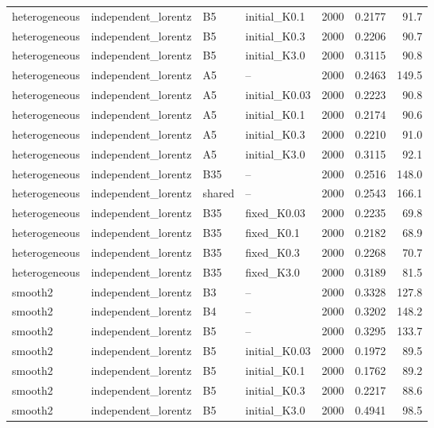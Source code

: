\begin{longtable}{llllrrr}
\rowcolor{oursbg}
heterogeneous & independent\_lorentz & B5 & initial\_K0.1 & 2000 & 0.2177 & 91.7 \\
\rowcolor{oursbg}
heterogeneous & independent\_lorentz & B5 & initial\_K0.3 & 2000 & 0.2206 & 90.7 \\
\rowcolor{oursbg}
heterogeneous & independent\_lorentz & B5 & initial\_K3.0 & 2000 & 0.3115 & 90.8 \\
heterogeneous & independent\_lorentz & A5 & -- & 2000 & 0.2463 & 149.5 \\
heterogeneous & independent\_lorentz & A5 & initial\_K0.03 & 2000 & 0.2223 & 90.8 \\
heterogeneous & independent\_lorentz & A5 & initial\_K0.1 & 2000 & 0.2174 & 90.6 \\
heterogeneous & independent\_lorentz & A5 & initial\_K0.3 & 2000 & 0.2210 & 91.0 \\
heterogeneous & independent\_lorentz & A5 & initial\_K3.0 & 2000 & 0.3115 & 92.1 \\
heterogeneous & independent\_lorentz & B35 & -- & 2000 & 0.2516 & 148.0 \\
heterogeneous & independent\_lorentz & shared & -- & 2000 & 0.2543 & 166.1 \\
heterogeneous & independent\_lorentz & B35 & fixed\_K0.03 & 2000 & 0.2235 & 69.8 \\
heterogeneous & independent\_lorentz & B35 & fixed\_K0.1 & 2000 & 0.2182 & 68.9 \\
heterogeneous & independent\_lorentz & B35 & fixed\_K0.3 & 2000 & 0.2268 & 70.7 \\
heterogeneous & independent\_lorentz & B35 & fixed\_K3.0 & 2000 & 0.3189 & 81.5 \\
smooth2 & independent\_lorentz & B3 & -- & 2000 & 0.3328 & 127.8 \\
smooth2 & independent\_lorentz & B4 & -- & 2000 & 0.3202 & 148.2 \\
\rowcolor{oursbg}
smooth2 & independent\_lorentz & B5 & -- & 2000 & 0.3295 & 133.7 \\
\rowcolor{oursbg}
smooth2 & independent\_lorentz & B5 & initial\_K0.03 & 2000 & 0.1972 & 89.5 \\
\rowcolor{oursbg}
smooth2 & independent\_lorentz & B5 & initial\_K0.1 & 2000 & 0.1762 & 89.2 \\
\rowcolor{oursbg}
smooth2 & independent\_lorentz & B5 & initial\_K0.3 & 2000 & 0.2217 & 88.6 \\
\rowcolor{oursbg}
smooth2 & independent\_lorentz & B5 & initial\_K3.0 & 2000 & 0.4941 & 98.5 \\

\end{longtable}
